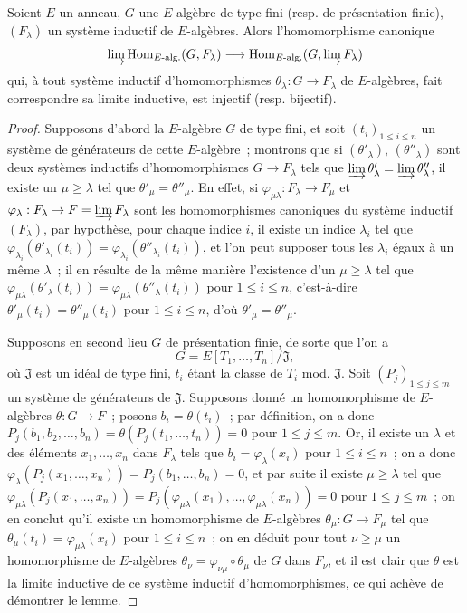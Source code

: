 \begin{lemma}[8.8.2.3]
\label{IV.8.8.2.3-fr}
Soient $E$ un anneau, $G$ une $E$-algèbre de type fini (resp. de présentation
finie), $(F_\lambda)$ un système inductif de $E$-algèbres. Alors
l'homomorphisme canonique
\[
\varinjlim\operatorname{Hom}_{E\text{-alg.}}(G,F_\lambda)
\longrightarrow
\operatorname{Hom}_{E\text{-alg.}}(G,\varinjlim F_\lambda)
\]
qui, à tout système inductif d'homomorphismes
$\theta_\lambda:G\to F_\lambda$ de $E$-algèbres, fait correspondre sa limite
inductive, est injectif (resp. bijectif).
\end{lemma}

\begin{proof}
Supposons d'abord la $E$-algèbre $G$ de type fini, et soit
$(t_i)_{1\leq i\leq n}$ un système de générateurs de cette $E$-algèbre~;
montrons que si $(\theta'_\lambda)$, $(\theta''_\lambda)$ sont deux systèmes
inductifs d'homomorphismes $G\to F_\lambda$ tels que
$\varinjlim\theta'_\lambda=\varinjlim\theta''_\lambda$, il existe un
$\mu\geq\lambda$ tel que $\theta'_\mu=\theta''_\mu$. En effet, si
$\varphi_{\mu\lambda}:F_\lambda\to F_\mu$ et
$\varphi_\lambda:F_\lambda\to F=\varinjlim F_\lambda$ sont les
homomorphismes canoniques du système inductif $(F_\lambda)$, par hypothèse,
pour chaque indice $i$, il existe un indice $\lambda_i$ tel que
$\varphi_{\lambda_i}(\theta'_{\lambda_i}(t_i))=
\varphi_{\lambda_i}(\theta''_{\lambda_i}(t_i))$, et l'on peut supposer tous
les $\lambda_i$ égaux à un même $\lambda$~; il en résulte de la même manière
l'existence d'un $\mu\geq\lambda$ tel que
$\varphi_{\mu\lambda}(\theta'_\lambda(t_i))=
\varphi_{\mu\lambda}(\theta''_\lambda(t_i))$ pour $1\leq i\leq n$,
c'est-à-dire $\theta'_\mu(t_i)=\theta''_\mu(t_i)$ pour $1\leq i\leq n$,
d'où $\theta'_\mu=\theta''_\mu$.

Supposons en second lieu $G$ de présentation finie, de sorte que l'on a
\[
G=E[T_1,\ldots,T_n]/\mathfrak J,
\]
où $\mathfrak J$ est un idéal de type fini, $t_i$ étant la classe de $T_i$
mod. $\mathfrak J$. Soit $(P_j)_{1\leq j\leq m}$ un système de générateurs de
$\mathfrak J$. Supposons donné un homomorphisme de $E$-algèbres
$\theta:G\to F$~; posons $b_i=\theta(t_i)$~; par définition, on a donc
$P_j(b_1,b_2,\ldots,b_n)=\theta(P_j(t_1,\ldots,t_n))=0$ pour
$1\leq j\leq m$. Or, il existe un $\lambda$ et des éléments
$x_1,\ldots,x_n$ dans $F_\lambda$ tels que $b_i=\varphi_\lambda(x_i)$ pour
$1\leq i\leq n$~; on a donc
$\varphi_\lambda(P_j(x_1,\ldots,x_n))=P_j(b_1,\ldots,b_n)=0$, et par suite il
existe $\mu\geq\lambda$ tel que
$\varphi_{\mu\lambda}(P_j(x_1,\ldots,x_n))=
P_j(\varphi_{\mu\lambda}(x_1),\ldots,\varphi_{\mu\lambda}(x_n))=0$ pour
$1\leq j\leq m$~; on en conclut qu'il existe un homomorphisme de
$E$-algèbres $\theta_\mu:G\to F_\mu$ tel que
$\theta_\mu(t_i)=\varphi_{\mu\lambda}(x_i)$
pour $1\leq i\leq n$~; on en déduit pour tout $\nu\geq\mu$ un
homomorphisme de $E$-algèbres
$\theta_\nu=\varphi_{\nu\mu}\circ\theta_\mu$ de $G$ dans $F_\nu$, et il est
clair que $\theta$ est la limite inductive de ce système inductif
d'homomorphismes, ce qui achève de démontrer le lemme.


\end{proof}
